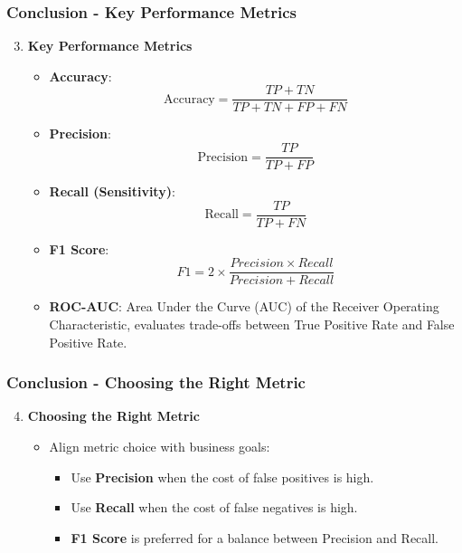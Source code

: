 \documentclass[aspectratio=169]{beamer}
\begin{document}
\begin{frame}[fragile]
    \frametitle{Conclusion - Key Performance Metrics}
    \begin{enumerate}
        \setcounter{enumi}{2}
        \item \textbf{Key Performance Metrics}
        \begin{itemize}
            \item \textbf{Accuracy}: 
            \begin{equation} 
                \text{Accuracy} = \frac{TP + TN}{TP + TN + FP + FN} 
            \end{equation}
            \item \textbf{Precision}: 
            \begin{equation} 
                \text{Precision} = \frac{TP}{TP + FP} 
            \end{equation}
            \item \textbf{Recall (Sensitivity)}: 
            \begin{equation} 
                \text{Recall} = \frac{TP}{TP + FN} 
            \end{equation}
            \item \textbf{F1 Score}: 
            \begin{equation} 
                F1 = 2 \times \frac{Precision \times Recall}{Precision + Recall} 
            \end{equation}
            \item \textbf{ROC-AUC}: Area Under the Curve (AUC) of the Receiver Operating Characteristic, evaluates trade-offs between True Positive Rate and False Positive Rate.
        \end{itemize}
    \end{enumerate}
\end{frame}

\begin{frame}[fragile]
    \frametitle{Conclusion - Choosing the Right Metric}
    \begin{enumerate}
        \setcounter{enumi}{3}
        \item \textbf{Choosing the Right Metric}
        \begin{itemize}
            \item Align metric choice with business goals:
            \begin{itemize}
                \item Use \textbf{Precision} when the cost of false positives is high.
                \item Use \textbf{Recall} when the cost of false negatives is high.
                \item \textbf{F1 Score} is preferred for a balance between Precision and Recall.
            \end{itemize}
        \end{itemize}
    \end{enumerate}
\end{frame}
\end{document}
